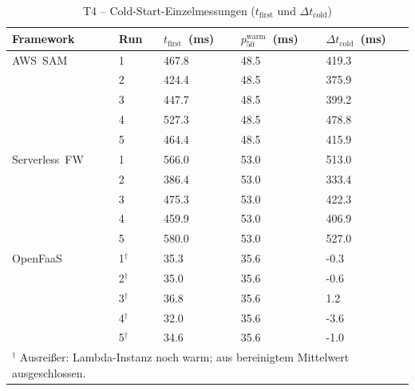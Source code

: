 \begin{table}[htbp]
\centering
\caption{T4 -- Cold-Start-Einzelmessungen ($t_{\mathrm{first}}$ und $\Delta t_{\mathrm{cold}}$)}
\label{tab:t4-einzelmessungen}
\begin{tabularx}{\textwidth}{llXXX}
\toprule
\textbf{Framework} & \textbf{Run} & \textbf{$t_{\mathrm{first}}$~(ms)} & \textbf{$p_{50}^{\mathrm{warm}}$~(ms)} & \textbf{$\Delta t_{\mathrm{cold}}$~(ms)} \\
\midrule
    AWS~SAM & 1 & 467.8 & 48.5 & 419.3 \\
     & 2 & 424.4 & 48.5 & 375.9 \\
     & 3 & 447.7 & 48.5 & 399.2 \\
     & 4 & 527.3 & 48.5 & 478.8 \\
     & 5 & 464.4 & 48.5 & 415.9 \\
    \midrule
    Serverless~FW & 1 & 566.0 & 53.0 & 513.0 \\
     & 2 & 386.4 & 53.0 & 333.4 \\
     & 3 & 475.3 & 53.0 & 422.3 \\
     & 4 & 459.9 & 53.0 & 406.9 \\
     & 5 & 580.0 & 53.0 & 527.0 \\
    \midrule
    OpenFaaS & 1$^{\dagger}$ & 35.3 & 35.6 & -0.3 \\
     & 2$^{\dagger}$ & 35.0 & 35.6 & -0.6 \\
     & 3$^{\dagger}$ & 36.8 & 35.6 & 1.2 \\
     & 4$^{\dagger}$ & 32.0 & 35.6 & -3.6 \\
     & 5$^{\dagger}$ & 34.6 & 35.6 & -1.0 \\
    \midrule
    \multicolumn{5}{l}{\small $^{\dagger}$ Ausreißer: Lambda-Instanz noch warm; aus bereinigtem Mittelwert ausgeschlossen.} \\
\bottomrule
\end{tabularx}
\end{table}